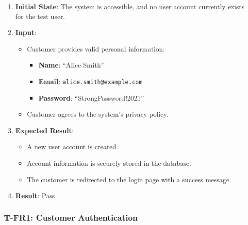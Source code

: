 \documentclass[12pt, titlepage]{article}
\begin{document}
\begin{enumerate}
    \item \textbf{Initial State}: The system is accessible, and no user account currently exists for the test user.
    \item \textbf{Input}:
    \begin{itemize}
        \item Customer provides valid personal information:
        \begin{itemize}
            \item \textbf{Name}: ``Alice Smith''
            \item \textbf{Email}: \texttt{alice.smith@example.com}
            \item \textbf{Password}: ``StrongPassword!2021''
        \end{itemize}
        \item Customer agrees to the system's privacy policy.
    \end{itemize}
        \item \textbf{Expected Result}:
        \begin{itemize}
            \item A new user account is created.
            \item Account information is securely stored in the database.
            \item The customer is redirected to the login page with a success message.
        \end{itemize}
        \item \textbf{Result}: Pass
\end{enumerate}
\subsubsection*{T-FR1: Customer Authentication}
\end{document}
